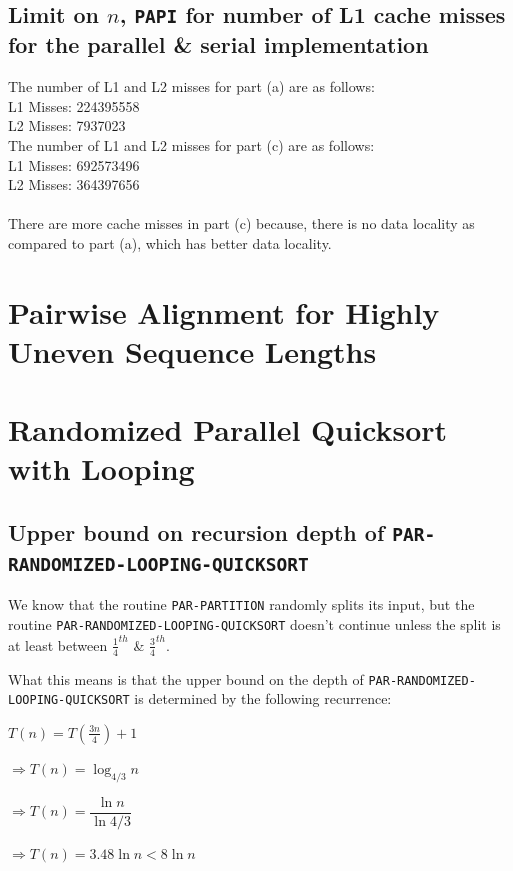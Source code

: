 \documentclass{article}
\begin{document}
\subsection{Limit on $n$, \texttt{PAPI} for number of L1 cache misses for the parallel \& serial implementation}
The number of L1 and L2 misses for part (a) are as follows:\\
L1 Misses: 224395558\\
L2 Misses: 7937023\\

The number of L1 and L2 misses for part (c) are as follows:\\
L1 Misses: 692573496\\
L2 Misses: 364397656\\
\\
There are more cache misses in part (c) because, there is no data locality
as compared to part (a), which has better data locality.

\clearpage

\section{Pairwise Alignment for Highly Uneven Sequence Lengths}

\clearpage

\section{Randomized Parallel Quicksort with Looping}

\subsection{Upper bound on recursion depth of \texttt{PAR-RANDOMIZED-LOOPING-QUICKSORT}}

We know that the routine \texttt{PAR-PARTITION} randomly splits its
input, but the routine \texttt{PAR-RANDOMIZED-LOOPING-QUICKSORT}
doesn't continue unless the split is at least between
$\frac{1}{4}^{th}$ \& $\frac{3}{4}^{th}$.

What this means is that the upper bound on the depth of
\texttt{PAR-RANDOMIZED-LOOPING-QUICKSORT} is determined by the
following recurrence:

$T(n) = T(\frac{3n}{4}) + 1$

$\Rightarrow T(n) = \log_{4/3}{n}$

$\Rightarrow T(n) = \dfrac{\ln{n}}{\ln{4/3}}$

$\Rightarrow T(n) = 3.48\ln{n} < 8\ln{n}$
\end{document}
